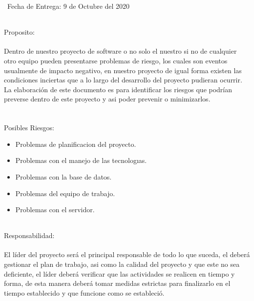 \documentclass[40pt]{article}
\begin{document}
\maketitle
\textsf{\ Fecha de Entrega: 9 de Octubre del 2020 \\}

\newpage

\maketitle
\textsf{\ \\
Proposito:\\
\\
Dentro de nuestro proyecto de software o no solo el nuestro si no de cualquier otro equipo pueden presentarse problemas de riesgo, los cuales son eventos usualmente de impacto negativo, en nuestro proyecto de igual forma existen las condiciones inciertas que a lo largo del desarrollo del proyecto pudieran ocurrir. La elaboración de este documento es para identificar los riesgos que podrían preverse dentro de este proyecto y asi poder prevenir o minimizarlos. \\}
\\
\\
Posibles Riesgos:
\begin{itemize}
    \item Problemas de planificacion del proyecto.
    \item Problemas con el manejo de las tecnologıas.
    \item Problemas con la base de datos.
    \item Problemas del equipo de trabajo.
    \item Problemas con el servidor.   
\end{itemize}



\maketitle
\textsf{\ 
\\
Responsabilidad:\\
\\
El líder del proyecto será el principal responsable de todo lo que suceda, el deberá gestionar el plan de trabajo, asi como la calidad del proyecto y que este no sea deficiente, el líder deberá verificar que las actividades se realicen en tiempo y forma, de esta manera deberá tomar medidas estrictas para finalizarlo en el tiempo establecido y que funcione como se estableció. \\}
\end{document}
